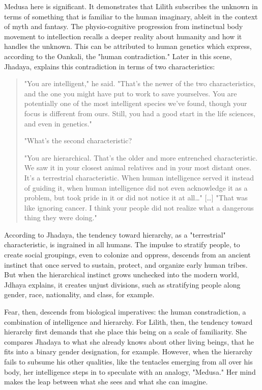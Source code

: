 \documentclass[11pt]{article}
\begin{document}
Medusa here is significant. It demonstrates that Lilith subscribes the
unknown in terms of something that is familiar to the human imaginary,
ableit in the context of myth and fantasy. The physio-cognitive
progression from instinctual body movement to intellection recalls a
deeper reality about humanity and how it handles the unknown. This can
be attributed to human genetics which express, according to the
Oankali, the "human contradiction." Later in this scene, Jhadaya,
explains this contradiction in terms of two characteristics: 
\begin{quote}
"You are intelligent," he said. "That's the newer of the two
characteristics, and the one you might have put to work to save
yourselves. You are potentially one of the most intelligent species
we've found, though your focus is different from ours. Still, you had
a good start in the life sciences, and even in genetics."

"What's the second characteristic?  

"You are hierarchical. That's the older and more entrenched
characteristic. We saw it in your closest animal relatives and in your
most distant ones. It's a terrestrial characteristic. When human
intelligence served it instead of guiding it, when human intelligence
did not even acknowledge it as a problem, but took pride in it or did
not notice it at all\ldots{}" [\ldots{}] "That was like ignoring cancer. I
think your people did not realize what a dangerous thing they were
doing."
\end{quote}
According to Jhadaya, the tendency toward hierarchy, as a
"terrestrial" characteristic, is ingrained in all humans. The impulse
to stratify people, to create social groupings, even to colonize and
oppress, descends from an ancient instinct that once served to
sustain, protect, and organize early human tribes. But when the
hierarchical instinct grows unchecked into the modern world, Jdhaya
explains, it creates unjust divisions, such as stratifying people
along gender, race, nationality, and class, for example. 

Fear, then, descends from biological imperatives: the human
constradiction, a combination of intelligence and hierarchy. For
Lilith, then, the tendency toward hierarchy first demands that she
place this being on a scale of familiarity. She compares Jhadaya to
what she already knows about other living beings, that he fits into a
binary gender designation, for example. However, when the hierarchy
fails to subsume his other qualities, like the tentacles emerging from
all over his body, her intelligence steps in to speculate with an
analogy, "Medusa." Her mind makes the leap between what she sees and
what she can imagine.
\end{document}
